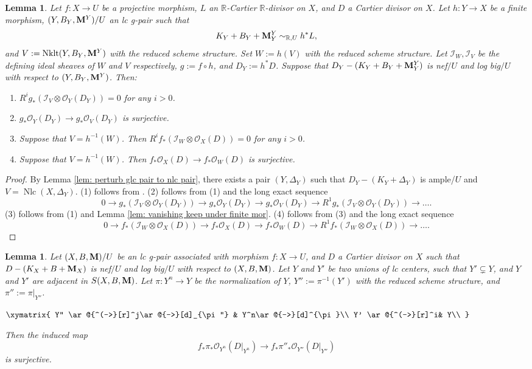 \documentclass[11pt]{amsart}
\numberwithin{equation}{section}
\newcommand{\Mm}{{\bf{M}}}
\newcommand{\Rr}{\mathbb{R}}
\newcommand{\Nklt}{\operatorname{Nklt}}
\newcommand{\Nlc}{\operatorname{Nlc}}
\newtheorem{lem}[thm]{Lemma}
\theoremstyle{definition}
\theoremstyle{definition}
\theoremstyle{definition}
\begin{document}
\begin{lem}\label{lem:3.1}
Let $f: X\rightarrow U$ be a projective morphism, $L$ an $\Rr$-Cartier $\Rr$-divisor on $X$, and $D$ a Cartier divisor on $X$. Let $h: Y\rightarrow X$ be a finite morphism, $(Y,B_Y,\Mm^Y)/U$ an lc g-pair such that 
$$K_Y+B_Y+\Mm^Y_Y\sim_{\mathbb R,U}h^*L,$$
and $V:=\Nklt(Y,B_Y,\Mm^Y)$ with the reduced scheme structure. Set $W:=h(V)$ with the reduced scheme structure. Let $\mathcal{I}_W,\mathcal{I}_V$ be the defining ideal sheaves of $W$ and $V$ respectively, $g:=f\circ h$, and $D_Y:=h^*D$. Suppose that $D_Y-(K_Y+B_Y+\Mm^Y_Y)$ is nef$/U$ and log big$/U$ with respect to $(Y,B_Y,\Mm^Y)$. Then:
\begin{enumerate}
	\item $R^ig_*(\mathcal{I}_V\otimes\mathcal{O}_Y(D_Y))=0$ for any $i>0$.
    \item $g_*\mathcal{O}_Y(D_Y)\rightarrow g_*\mathcal{O}_V(D_Y)$ is surjective.
    \item Suppose that $V=h^{-1}(W)$. Then $R^if_*(\mathcal{I}_W\otimes\mathcal{O}_X(D))=0$ for any $i>0$.
    \item Suppose that $V=h^{-1}(W)$. Then $f_*\mathcal{O}_X(D)\rightarrow f_*\mathcal{O}_W(D)$ is surjective.
\end{enumerate}
\end{lem}
\begin{proof}
By Lemma \ref{lem: perturb glc pair to nlc pair}, there exists a pair $(Y,\Delta_Y)$ such that $D_Y-(K_Y+\Delta_Y)$ is ample/$U$ and $V=\Nlc(X,\Delta_Y)$. (1) follows from  \cite[Theorem 8.1]{Fuj11}. 
 (2) follows from (1) and the long exact sequence
$$0\rightarrow g_*(\mathcal{I}_V\otimes\mathcal{O}_Y(D_Y))\rightarrow g_*\mathcal{O}_Y(D_Y)\rightarrow g_*\mathcal{O}_V(D_Y)\rightarrow R^1g_*(\mathcal{I}_V\otimes\mathcal{O}_Y(D_Y))\rightarrow\dots.$$
(3) follows from (1) and Lemma \ref{lem: vanishing keep under finite mor}. (4) follows from (3) and the long exact sequence
$$0\rightarrow f_*(\mathcal{I}_W\otimes\mathcal{O}_X(D))\rightarrow f_*\mathcal{O}_X(D)\rightarrow f_*\mathcal{O}_W(D)\rightarrow R^1f_*(\mathcal{I}_W\otimes\mathcal{O}_X(D))\rightarrow\dots.$$
\end{proof}

\begin{lem}\label{lem:3.2}
Let $(X,B,\Mm)/U$ be an lc g-pair associated with morphism $f: X\rightarrow U$, and $D$ a Cartier divisor on $X$ such that $D-(K_X+B+\Mm_X)$ is nef$/U$ and log big$/U$ with respect to $(X,B,\Mm)$. Let $Y$ and $Y'$ be two unions of lc centers, such that $Y'\subsetneq Y$, and $Y$ and $Y'$ are adjacent in $S(X,B,\Mm)$. Let $\pi: Y^n\rightarrow Y$ be the normalization of $Y$, $Y'':=\pi^{-1}(Y')$ with the reduced scheme structure, and $\pi'':=\pi|_{Y''}$.
\begin{center}
$\xymatrix{
Y'' \ar@{^(->}[r]^j\ar@{->}[d]_{\pi''} & Y^n\ar@{->}[d]^{\pi}\\
Y' \ar@{^(->}[r]^i& Y\\
}$
\end{center}
Then the induced map
$$f_*\pi_*\mathcal{O}_{Y^n}(D|_{Y^n}) \rightarrow f_*\pi''_*\mathcal{O}_{Y''}(D|_{Y''})$$
is surjective.
\end{lem}
\end{document}
